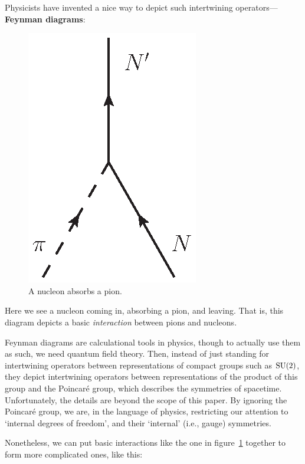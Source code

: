 \documentclass{article}
\newcommand{\SU}{{\rm SU}}    %
\begin{document}
Physicists have invented a nice way to depict such
intertwining operators---\textbf{Feynman diagrams}:
\begin{figure}[H]
	\begin{center}
		\includegraphics[scale=0.75]{piN_vertex}
	\end{center}
	\caption{A nucleon absorbs a pion.} \label{fig:piN_vertex}
\end{figure}

\noindent
Here we see a nucleon coming in, absorbing a pion, and leaving. That is, this
diagram depicts a basic \emph{interaction} between pions and nucleons.

Feynman diagrams are calculational tools in physics, though to actually
use them as such, we need quantum field theory. Then, instead of just
standing for intertwining operators between representations of compact
groups such as $\SU(2)$, they depict intertwining operators between
representations of the product of this group and the Poincar\'e group, 
which describes the symmetries of spacetime.  Unfortunately, the 
details are beyond the scope of this paper.  By ignoring the 
Poincar\'e group, we are, in the language of physics, restricting 
our attention to `internal degrees of freedom', and their `internal' 
(i.e., gauge) symmetries.

Nonetheless, we can put basic interactions like the one in
figure~\ref{fig:piN_vertex} together to form more complicated ones, like
this:
\end{document}
